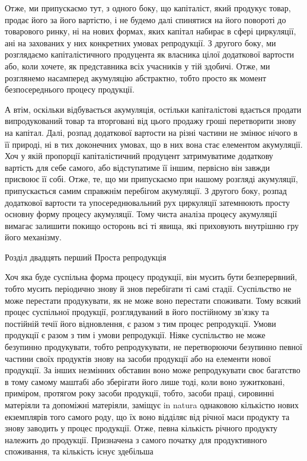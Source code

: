 Отже, ми припускаємо тут, з одного боку, що капіталіст,
який продукує товар, продає його за його вартістю, і не будемо
далі спинятися на його повороті до товарового ринку, ні на
нових формах, яких капітал набирає в сфері циркуляції, ані на
захованих у них конкретних умовах репродукції. З другого боку,
ми розглядаємо капіталістичного продуцента як власника цілої
додаткової вартости або, коли хочете, як представника всіх учасників
у тій здобичі. Отже, ми розглянемо насамперед акумуляцію
абстрактно, тобто просто як момент безпосереднього процесу
продукції.

А втім, оскільки відбувається акумуляція, остільки капіталістові
вдається продати випродукований товар та вторговані
від цього продажу гроші перетворити знову на капітал. Далі,
розпад додаткової вартости на різні частини не змінює нічого в
її природі, ні в тих доконечних умовах, що в них вона стає елементом
акумуляції. Хоч у якій пропорції капіталістичний продуцент
затримуватиме додаткову вартість для себе самого, або
відступатиме її іншим, первісно він завжди присвоює її собі.
Отже, те, що ми припускаємо при нашому розгляді акумуляції,
припускається самим справжнім перебігом акумуляції. З другого
боку, розпад додаткової вартости та упосереднювальний рух циркуляції
затемнюють просту основну форму процесу акумуляції.
Тому чиста аналіза процесу акумуляції вимагає залишити покищо
осторонь всі ті явища, які приховують внутрішню гру його
механізму.

Розділ двадцять перший
Проста репродукція

Хоч яка буде суспільна форма процесу продукції, він мусить
бути безперервний, тобто мусить періодично знову й знов перебігати
ті самі стадії. Суспільство не може перестати продукувати,
як не може воно перестати споживати. Тому всякий процес
суспільної продукції, розглядуваний в його постійному зв’язку
та постійній течії його відновлення, є разом з тим процес репродукції.
Умови продукції є разом з тим і умови репродукції. Ніяке
суспільство не може безупинно продукувати, тобто репродукувати,
не перетворюючи безупинно певної частини своїх продуктів
знову на засоби продукції або на елементи нової продукції.
За інших незмінних обставин воно може репродукувати своє багатство
в тому самому маштабі або зберігати його лише тоді, коли
воно зужитковані, приміром, протягом року засоби продукції,
тобто, засоби праці, сировинні матеріяли та допоміжні матеріяли,
заміщує in natura однаковою кількістю нових екземплярів того
самого роду, що їх воно відділяє від річної маси продукту та
знову заводить у процес продукції. Отже, певна кількість річного
продукту належить до продукції. Призначена з самого початку
для продуктивного споживання, та кількість існує здебільша
\parbreak{}  %
